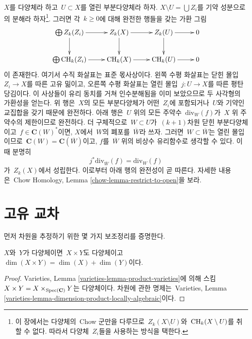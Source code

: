 \noindent
$X$를 다양체라 하고\  $U \subset X$를 열린 부분다양체라 하자.
$X \setminus U = \bigcup Z_i$를 기약 성분으로의 분해라 하자\footnote{
이 장에서는 다양체의\  Chow 군만을 다루므로\  $Z_k(X \setminus U)$와\ 
$\mathop{\mathrm{CH}}\nolimits_k(X \setminus U)$를 취할 수 없다. 따라서 다양체\  $Z_i$들을 사용하는
방식을 택한다.}. 그러면 각\  $k \geq 0$에 대해 완전한 행들을 갖는 가환 그림
$$
\xymatrix{
\bigoplus Z_k(Z_i) \ar[r] \ar[d] &
Z_k(X) \ar[r] \ar[d] &
Z_k(U) \ar[d] \ar[r] &
0 \\
\bigoplus \CH_k(Z_i) \ar[r] &
\CH_k(X) \ar[r] &
\CH_k(U) \ar[r] &
0
}
$$
이 존재한다. 여기서 수직 화살표는 표준 몫사상이다. 왼쪽 수평 화살표는
닫힌 몰입\  $Z_i \to X$를 따른 고유 밂이고, 오른쪽 수평 화살표는 열린 몰입\ 
$j : U \to X$를 따른 평탄 당김이다. 이 사상들이 유리 동치를 거쳐
인수분해됨을 이미 보았으므로 두 사각형의 가환성을 얻는다.
위 행은\  $X$의 모든 부분다양체가 어떤\  $Z_i$에 포함되거나\  $U$와 기약인
교집합을 갖기 때문에 완전하다. 아래 행은\  $U$ 위의 모든 주약수\ 
$\text{div}_W(f)$가\  $X$ 위 주약수의 제한이므로 완전하다.
더 구체적으로\  $W \subset U$가\  $(k + 1)$차원 닫힌 부분다양체이고\ 
$f \in \mathbf{C}(W)^*$이면, $X$에서\  $W$의 폐포를\  $\overline{W}$라
쓰자. 그러면\  $W \subset \overline{W}$는 열린 몰입이므로\ 
$\mathbf{C}(W) = \mathbf{C}(\overline{W})$이고, $f$를\ 
$\overline{W}$ 위의 비상수 유리함수로 생각할 수 있다. 이때 분명히
$$
j^*\text{div}_{\overline{W}}(f) = \text{div}_W(f)
$$
가\  $Z_k(X)$에서 성립한다. 이로부터 아래 행의 완전성이 곧 따른다.
자세한 내용은\  Chow Homology, Lemma
\ref{chow-lemma-restrict-to-open}을 보라.


\section{고유 교차}
\label{section-intersect-properly}

\noindent
먼저 차원을 추정하기 위한 몇 가지 보조정리를 증명한다.

\begin{lemma}
\label{lemma-dimension-product-varieties}
$X$와\  $Y$가 다양체이면\  $X \times Y$도 다양체이고\ 
$\dim(X \times Y) = \dim(X) + \dim(Y)$이다.
\end{lemma}

\begin{proof}
Varieties, Lemma \ref{varieties-lemma-product-varieties}에 의해 스킴\ 
$X \times Y = X \times_{\mathop{\mathrm{Spec}}(\mathbf{C})} Y$는 다양체이다.
차원에 관한 명제는\  Varieties, Lemma
\ref{varieties-lemma-dimension-product-locally-algebraic}이다.
\end{proof}

